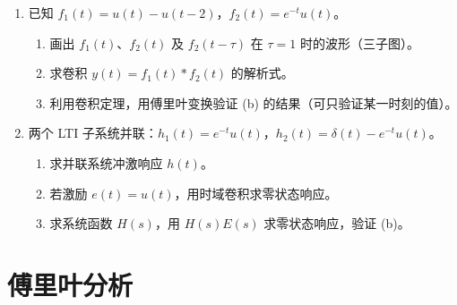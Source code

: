 \documentclass[11pt,a4paper]{ctexart}
\newcommand{\dirac}{\delta}
\begin{document}
\begin{enumerate}[label=\textbf{题\arabic*.},leftmargin=*,itemsep=1.2em,start=4]
\item \label{q:6}
已知 $f_1(t)=u(t)-u(t-2)$，$f_2(t)=e^{-t}u(t)$。
\begin{enumerate}[label=(\alph*)]
    \item 画出 $f_1(t)$、$f_2(t)$ 及 $f_2(t-\tau)$ 在 $\tau=1$ 时的波形（三子图）。
    \item 求卷积 $y(t)=f_1(t)*f_2(t)$ 的解析式。
    \item 利用卷积定理，用傅里叶变换验证 (b) 的结果（可只验证某一时刻的值）。
\end{enumerate}

\item \label{q:7}
两个 LTI 子系统并联：$h_1(t)=e^{-t}u(t)$，$h_2(t)=\dirac(t)-e^{-t}u(t)$。
\begin{enumerate}[label=(\alph*)]
    \item 求并联系统冲激响应 $h(t)$。
    \item 若激励 $e(t)=u(t)$，用时域卷积求零状态响应。
    \item 求系统函数 $H(s)$，用 $H(s)E(s)$ 求零状态响应，验证 (b)。
\end{enumerate}

\end{enumerate}

\section{傅里叶分析}
\end{document}
